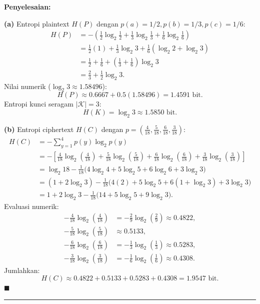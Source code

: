 \documentclass[11pt,a4paper]{article}
\newenvironment{solusi}{\noindent\textbf{\textsf{Penyelesaian:}}\par\vspace{0.2em}}{\hfill$\blacksquare$\vspace{1em}\par\hrule\vspace{1em}}
\begin{document}
\begin{solusi}
\textbf{(a)} Entropi plaintext $H(P)$ dengan $p(a) = 1/2, p(b) = 1/3, p(c) = 1/6$:
\begin{align*}
H(P) &= -\left(\frac{1}{2}\log_2\frac{1}{2} + \frac{1}{3}\log_2\frac{1}{3} + \frac{1}{6}\log_2\frac{1}{6}\right) \\
&= \frac{1}{2}(1) + \frac{1}{3}\log_2 3 + \frac{1}{6}(\log_2 2 + \log_2 3) \\
&= \frac{1}{2} + \frac{1}{6} + \left(\frac{1}{3} + \frac{1}{6}\right)\log_2 3 \\
&= \frac{2}{3} + \frac{1}{2}\log_2 3.
\end{align*}
Nilai numerik ($\log_2 3 \approx 1.58496$):
\[
H(P) \approx 0.6667 + 0.5(1.58496) = 1.4591 \text{ bit}.
\]
Entropi kunci seragam $|\mathcal{K}| = 3$:
\[
H(K) = \log_2 3 \approx 1.5850 \text{ bit}.
\]

\textbf{(b)} Entropi ciphertext $H(C)$ dengan $p = \left(\frac{4}{18}, \frac{5}{18}, \frac{6}{18}, \frac{3}{18}\right)$:
\begin{align*}
H(C) &= -\sum_{y=1}^4 p(y) \log_2 p(y) \\
&= -\left[\frac{4}{18}\log_2\left(\frac{4}{18}\right) + \frac{5}{18}\log_2\left(\frac{5}{18}\right) + \frac{6}{18}\log_2\left(\frac{6}{18}\right) + \frac{3}{18}\log_2\left(\frac{3}{18}\right)\right] \\
&= \log_2 18 - \frac{1}{18}\big(4\log_2 4 + 5\log_2 5 + 6\log_2 6 + 3\log_2 3\big) \\
&= (1 + 2\log_2 3) - \frac{1}{18}\big(4(2) + 5\log_2 5 + 6(1 + \log_2 3) + 3\log_2 3\big) \\
&= 1 + 2\log_2 3 - \frac{1}{18}\big(14 + 5\log_2 5 + 9\log_2 3\big).
\end{align*}
Evaluasi numerik:
\begin{align*}
-\frac{4}{18}\log_2\left(\frac{4}{18}\right) &= -\frac{2}{9}\log_2\left(\frac{2}{9}\right) \approx 0.4822, \\
-\frac{5}{18}\log_2\left(\frac{5}{18}\right) &\approx 0.5133, \\
-\frac{6}{18}\log_2\left(\frac{6}{18}\right) &= -\frac{1}{3}\log_2\left(\frac{1}{3}\right) \approx 0.5283, \\
-\frac{3}{18}\log_2\left(\frac{3}{18}\right) &= -\frac{1}{6}\log_2\left(\frac{1}{6}\right) \approx 0.4308.
\end{align*}
Jumlahkan:
\[
H(C) \approx 0.4822 + 0.5133 + 0.5283 + 0.4308 = 1.9547 \text{ bit}.
\]
\end{solusi}
\end{document}
